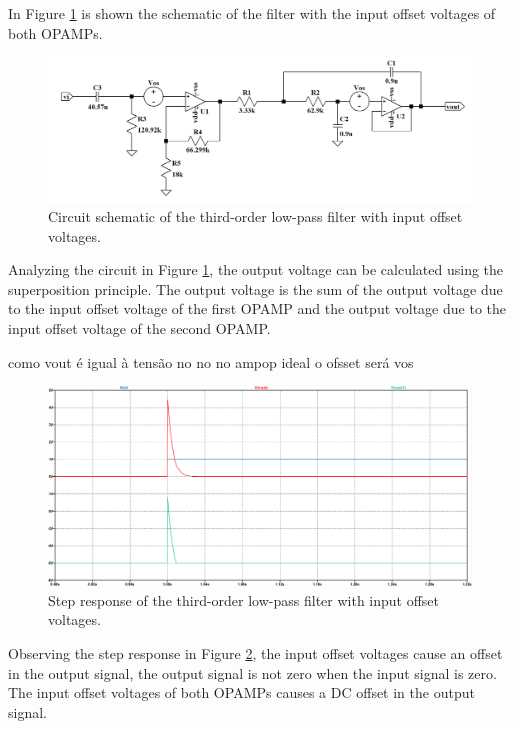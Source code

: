 In Figure \ref{fig:sch_vos} is shown the schematic of the filter with the input offset voltages of both OPAMPs.

\begin{figure}[H]
    \centering
    \includegraphics[width=1\linewidth]{images/sch_vos.png}
    \caption{Circuit schematic of the third-order low-pass filter with input offset voltages.}
    \label{fig:sch_vos}
\end{figure}

Analyzing the circuit in Figure \ref{fig:sch_vos}, the output voltage can be calculated using the superposition principle. The output voltage is the sum of the output voltage due to the input offset voltage of the first OPAMP and the output voltage due to the input offset voltage of the second OPAMP. 

como vout é igual à tensão no no no ampop ideal o ofsset será vos

\begin{figure}[H]
    \centering
    \includegraphics[width=1\linewidth]{images/step_vos.png}
    \caption{Step response of the third-order low-pass filter with input offset voltages.}
    \label{fig:step_vos}
\end{figure}

Observing the step response in Figure \ref{fig:step_vos}, the input offset voltages cause an offset in the output signal, the output signal is not zero when the input signal is zero. The input offset voltages of both OPAMPs causes a DC offset in the output signal.

